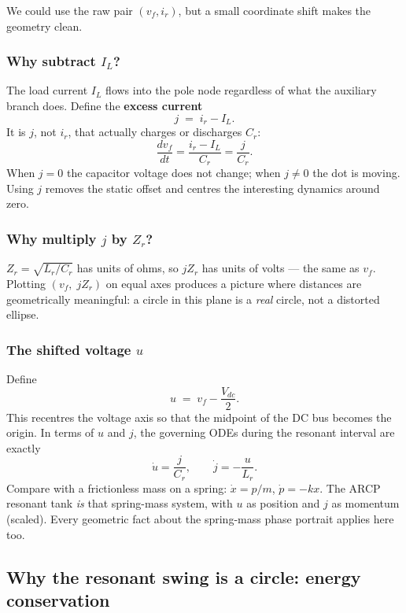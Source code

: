 \documentclass[12pt, a4paper]{article}
\newcommand{\Vdc}{V_{dc}}
\newcommand{\ir}{i_r}
\newcommand{\IL}{I_L}
\begin{document}
We could use the raw pair $(v_f, \ir)$, but a small coordinate shift makes
the geometry clean.

\subsubsection*{Why subtract $I_L$?}

The load current $I_L$ flows into the pole node regardless of what the
auxiliary branch does.
Define the \textbf{excess current}
\[
    j \;=\; \ir - \IL.
\]
It is $j$, not $\ir$, that actually charges or discharges $C_r$:
\[
    \frac{dv_f}{dt} = \frac{\ir - \IL}{C_r} = \frac{j}{C_r}.
\]
When $j = 0$ the capacitor voltage does not change; when $j \neq 0$ the
dot is moving.
Using $j$ removes the static offset and centres the interesting dynamics
around zero.

\subsubsection*{Why multiply $j$ by $Z_r$?}

$Z_r = \sqrt{L_r/C_r}$ has units of ohms, so $j Z_r$ has units of volts ---
the same as $v_f$.
Plotting $(v_f,\; j Z_r)$ on equal axes produces a picture where distances
are geometrically meaningful: a circle in this plane is a \emph{real} circle,
not a distorted ellipse.

\subsubsection*{The shifted voltage $u$}

Define
\[
    u \;=\; v_f - \frac{\Vdc}{2}.
\]
This recentres the voltage axis so that the midpoint of the DC bus becomes
the origin.
In terms of $u$ and $j$, the governing ODEs during the resonant interval are
exactly
\[
    \dot{u} = \frac{j}{C_r}, \qquad
    \dot{j} = -\frac{u}{L_r}.
\]
Compare with a frictionless mass on a spring:
$\dot{x} = p/m$, $\dot{p} = -kx$.
The ARCP resonant tank \emph{is} that spring-mass system, with $u$ as
position and $j$ as momentum (scaled).
Every geometric fact about the spring-mass phase portrait applies here too.

\subsection{Why the resonant swing is a circle: energy conservation}
\label{ssec:pp_circle}
\end{document}
